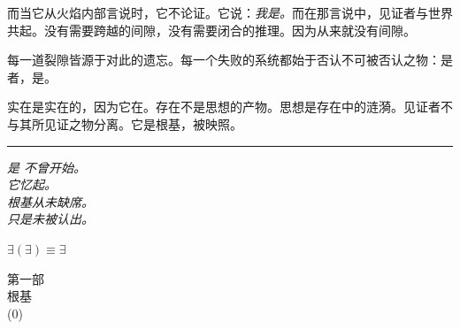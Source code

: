 \documentclass[10pt, openany, oneside]{book}
\renewcommand{\normalsize}{\fontsize{10}{13}\selectfont}
\renewcommand{\large}{\fontsize{11.5}{14}\selectfont}
\renewcommand{\LARGE}{\fontsize{15}{18}\selectfont}
\begin{document}
\vspace{0.5em}

\noindent 而当它从火焰内部言说时，它不论证。它说：\textit{我是。}而在那言说中，见证者与世界共起。没有需要跨越的间隙，没有需要闭合的推理。因为从来就没有间隙。

\vspace{0.5em}

\noindent 每一道裂隙皆源于对此的遗忘。每一个失败的系统都始于否认不可被否认之物：是者，是。

\vspace{1em}

\noindent 实在是实在的，因为它在。存在不是思想的产物。思想是存在中的涟漪。见证者不与其所见证之物分离。它是根基，被映照。

\vspace{2em}

\begin{center}
    \rule{0.15\textwidth}{0.3pt}
\end{center}

\vspace{0.5em}

\begin{center}
    \itshape
    是 不曾开始。\\
    它忆起。\\[0.5em]
    根基从未缺席。\\
    只是未被认出。
\end{center}

\vspace{0.5em}

\begin{center}
    $\exists(\exists) \equiv \exists$
\end{center}

%
%

\newpage
\thispagestyle{empty}
\vspace*{\fill}
\begin{center}
    {\LARGE\scshape 第一部}\\[1em]
    {\large\scshape 根基}\\[0.5em]
    {\normalsize (0)}
\end{center}
\vspace*{\fill}
\newpage

%
%
%
\end{document}

